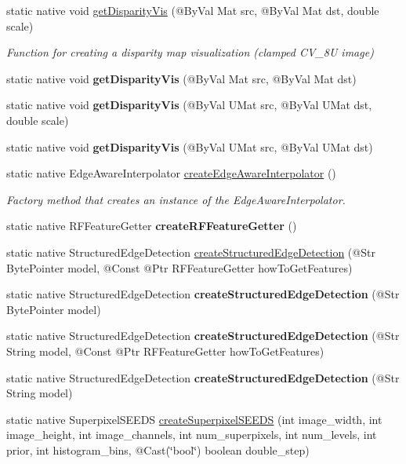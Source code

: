 \begin{DoxyCompactItemize}
\item 
static native void \hyperlink{group__ximgproc__filters_ga717daf2a9c80c6f731778cf45474ed2c}{get\+Disparity\+Vis} (@By\+Val Mat src, @By\+Val Mat dst, double scale)
\begin{DoxyCompactList}\small\item\em Function for creating a disparity map visualization (clamped C\+V\+\_\+8U image) \end{DoxyCompactList}\item 
static native void {\bfseries get\+Disparity\+Vis} (@By\+Val Mat src, @By\+Val Mat dst)
\item 
static native void {\bfseries get\+Disparity\+Vis} (@By\+Val U\+Mat src, @By\+Val U\+Mat dst, double scale)
\item 
static native void {\bfseries get\+Disparity\+Vis} (@By\+Val U\+Mat src, @By\+Val U\+Mat dst)
\item 
static native Edge\+Aware\+Interpolator \hyperlink{group__ximgproc__filters_ga2e4e024539c3de5affbf5c70b0baf30f}{create\+Edge\+Aware\+Interpolator} ()
\begin{DoxyCompactList}\small\item\em Factory method that creates an instance of the Edge\+Aware\+Interpolator. \end{DoxyCompactList}\item 
static native R\+F\+Feature\+Getter {\bfseries create\+R\+F\+Feature\+Getter} ()
\item 
static native Structured\+Edge\+Detection \hyperlink{group__ximgproc__edge_gafcb7c834ebdb82e5b362789a94b9e034}{create\+Structured\+Edge\+Detection} (@Str Byte\+Pointer model, @Const @Ptr R\+F\+Feature\+Getter how\+To\+Get\+Features)
\item 
static native Structured\+Edge\+Detection {\bfseries create\+Structured\+Edge\+Detection} (@Str Byte\+Pointer model)
\item 
static native Structured\+Edge\+Detection {\bfseries create\+Structured\+Edge\+Detection} (@Str String model, @Const @Ptr R\+F\+Feature\+Getter how\+To\+Get\+Features)
\item 
static native Structured\+Edge\+Detection {\bfseries create\+Structured\+Edge\+Detection} (@Str String model)
\item 
static native Superpixel\+S\+E\+E\+DS \hyperlink{group__ximgproc__superpixel_ga16f41a6ddd22daf4d1f1851a6f689466}{create\+Superpixel\+S\+E\+E\+DS} (int image\+\_\+width, int image\+\_\+height, int image\+\_\+channels, int num\+\_\+superpixels, int num\+\_\+levels, int prior, int histogram\+\_\+bins, @Cast(\char`\"{}bool\char`\"{}) boolean double\+\_\+step)

\end{DoxyCompactItemize}

